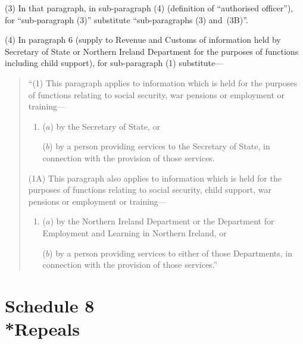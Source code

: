 \documentclass[12pt,a4paper]{article}
\begin{document}
(3) In that paragraph, in sub-paragraph (4) (definition of “authorised officer”), for “sub-paragraph (3)” substitute “sub-paragraphs (3) and~(3B)”.

(4) In paragraph 6 (supply to Revenue and Customs of information held by Secretary of State or Northern Ireland Department for the purposes of functions including child support), for sub-paragraph (1) substitute—
\begin{quotation}
“(1) This paragraph applies to information which is held for the purposes of functions relating to social security, war pensions or employment or training—
\begin{enumerate}\item[]
($a$) by the Secretary of State, or

($b$) by a person providing services to the Secretary of State, in connection with the provision of those services.
\end{enumerate}

(1A) This paragraph also applies to information which is held for the purposes of functions relating to social security, child support, war pensions or employment or training—
\begin{enumerate}\item[]
($a$) by the Northern Ireland Department or the Department for Employment and Learning in Northern Ireland, or

($b$) by a person providing services to either of those Departments, in connection with the provision of those services.”
\end{enumerate}
\end{quotation}


\part[Schedule 8 --- Repeals]{Schedule 8\\*Repeals}

\renewcommand\parthead{--- Schedule 8}
\end{document}
